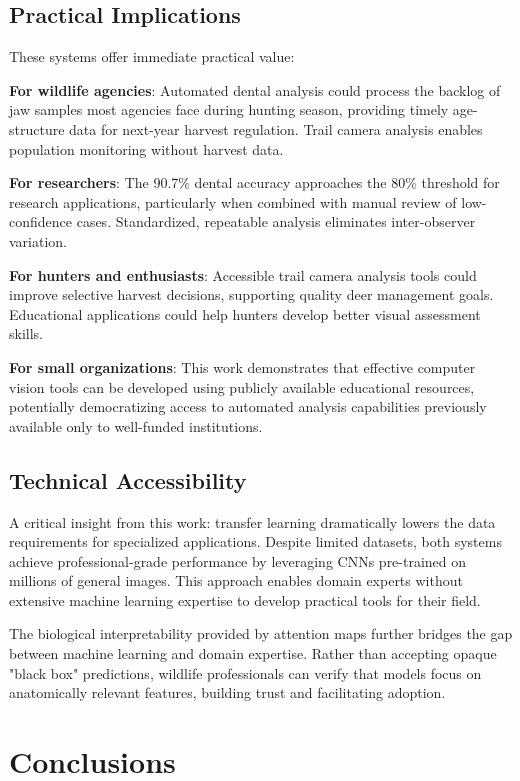 \documentclass[11pt]{article}
\begin{document}
\subsection{Practical Implications}

These systems offer immediate practical value:

\textbf{For wildlife agencies}: Automated dental analysis could process the backlog of jaw samples most agencies face during hunting season, providing timely age-structure data for next-year harvest regulation. Trail camera analysis enables population monitoring without harvest data.

\textbf{For researchers}: The 90.7\% dental accuracy approaches the 80\% threshold for research applications, particularly when combined with manual review of low-confidence cases. Standardized, repeatable analysis eliminates inter-observer variation.

\textbf{For hunters and enthusiasts}: Accessible trail camera analysis tools could improve selective harvest decisions, supporting quality deer management goals. Educational applications could help hunters develop better visual assessment skills.

\textbf{For small organizations}: This work demonstrates that effective computer vision tools can be developed using publicly available educational resources, potentially democratizing access to automated analysis capabilities previously available only to well-funded institutions.

\subsection{Technical Accessibility}

A critical insight from this work: transfer learning dramatically lowers the data requirements for specialized applications. Despite limited datasets, both systems achieve professional-grade performance by leveraging CNNs pre-trained on millions of general images. This approach enables domain experts without extensive machine learning expertise to develop practical tools for their field.

The biological interpretability provided by attention maps further bridges the gap between machine learning and domain expertise. Rather than accepting opaque "black box" predictions, wildlife professionals can verify that models focus on anatomically relevant features, building trust and facilitating adoption.

\section{Conclusions}
\end{document}

